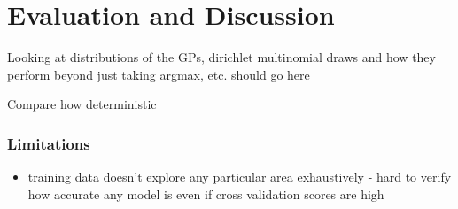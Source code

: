 \chapter{Evaluation and Discussion} \label{chap:evaluation}

Looking at distributions of the GPs, dirichlet multinomial draws and how they perform beyond just taking argmax, etc. should go here

Compare how deterministic

\subsection{Limitations}

\begin{itemize}
    \item training data doesn't explore any particular area exhaustively - hard to verify how accurate any model is even if cross validation scores are high
\end{itemize}
